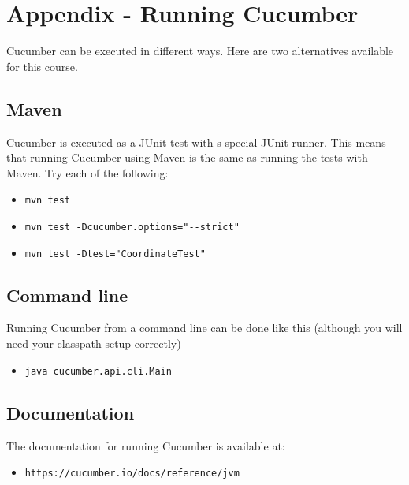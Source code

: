 \chapter*{Appendix - Running Cucumber}

Cucumber can be executed in different ways. Here are two alternatives available for this course.

\section*{Maven}

Cucumber is executed as a JUnit test with s special JUnit runner. This means that running Cucumber using Maven is the same as running the tests with Maven.
Try each of the following:

\begin{itemize}
    \item \texttt{mvn test}
    \item \texttt{mvn test -Dcucumber.options="-{}-strict"}
    \item \texttt{mvn test -Dtest="CoordinateTest"}
\end{itemize}

\section*{Command line}

Running Cucumber from a command line can be done like this (although you will need your classpath setup correctly)

\begin{itemize}
    \item \texttt{java cucumber.api.cli.Main}
\end{itemize}


\section*{Documentation}
The documentation for running Cucumber is available at: 

\begin{itemize}
    \item \texttt{https://cucumber.io/docs/reference/jvm}
\end{itemize}
